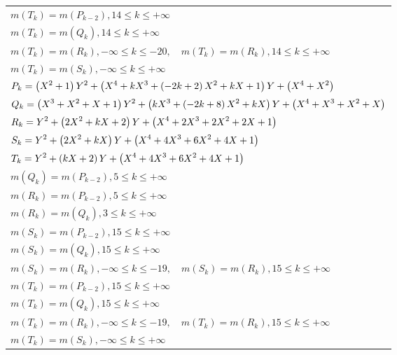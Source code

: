 \documentclass{amsart}
\begin{document}
\begin{longtable}{|l|}
\(\displaystyle m(T_k) = m(P_{k
 - 2}),14 \leqslant k \leqslant +\infty\)\\
\(\displaystyle m(T_k) = m(Q_{k}),14 \leqslant k \leqslant +\infty\)\\
\(\displaystyle m(T_k) = m(R_{k}),-\infty \leqslant k \leqslant -20,\quad m(T_k) = m(R_{k}),14 \leqslant k \leqslant +\infty\)\\
\(\displaystyle m(T_k) = m(S_{k}),-\infty \leqslant k \leqslant +\infty\)\\
\hline
\(\displaystyle P_k= \left(X^2
 + 1\right) \*Y^2
 + \left(X^4
 + k\*X^3
 + \left(-2\*k
 + 2\right) \*X^2
 + k\*X
 + 1\right) \*Y
 + \left(X^4
 + X^2\right) \)\\
\(\displaystyle Q_k= \left(X^3
 + X^2
 + X
 + 1\right) \*Y^2
 + \left(k\*X^3
 + \left(-2\*k
 + 8\right) \*X^2
 + k\*X\right) \*Y
 + \left(X^4
 + X^3
 + X^2
 + X\right) \)\\
\(\displaystyle R_k=Y^2
 + \left(2\*X^2
 + k\*X
 + 2\right) \*Y
 + \left(X^4
 + 2\*X^3
 + 2\*X^2
 + 2\*X
 + 1\right) \)\\
\(\displaystyle S_k=Y^2
 + \left(2\*X^2
 + k\*X\right) \*Y
 + \left(X^4
 + 4\*X^3
 + 6\*X^2
 + 4\*X
 + 1\right) \)\\
\(\displaystyle T_k=Y^2
 + \left(k\*X
 + 2\right) \*Y
 + \left(X^4
 + 4\*X^3
 + 6\*X^2
 + 4\*X
 + 1\right) \)\\
\(\displaystyle m(Q_k) = m(P_{k
 - 2}),5 \leqslant k \leqslant +\infty\)\\
\(\displaystyle m(R_k) = m(P_{k
 - 2}),5 \leqslant k \leqslant +\infty\)\\
\(\displaystyle m(R_k) = m(Q_{k}),3 \leqslant k \leqslant +\infty\)\\
\(\displaystyle m(S_k) = m(P_{k
 - 2}),15 \leqslant k \leqslant +\infty\)\\
\(\displaystyle m(S_k) = m(Q_{k}),15 \leqslant k \leqslant +\infty\)\\
\(\displaystyle m(S_k) = m(R_{k}),-\infty \leqslant k \leqslant -19,\quad m(S_k) = m(R_{k}),15 \leqslant k \leqslant +\infty\)\\
\(\displaystyle m(T_k) = m(P_{k
 - 2}),15 \leqslant k \leqslant +\infty\)\\
\(\displaystyle m(T_k) = m(Q_{k}),15 \leqslant k \leqslant +\infty\)\\
\(\displaystyle m(T_k) = m(R_{k}),-\infty \leqslant k \leqslant -19,\quad m(T_k) = m(R_{k}),15 \leqslant k \leqslant +\infty\)\\
\(\displaystyle m(T_k) = m(S_{k}),-\infty \leqslant k \leqslant +\infty\)\\

\end{longtable}
\end{document}
